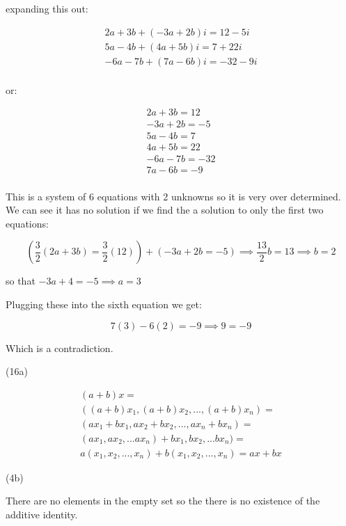 \documentclass{article}
\begin{document}
\noindent expanding this out:

\begin{gather*}
  2a + 3b + (-3a + 2b)i = 12 - 5i\\
  5a - 4b + (4a + 5b)i= 7 + 22i\\
  -6a - 7b + (7a - 6b)i = -32 - 9i\\
\end{gather*}

\noindent or:

\begin{gather*}
  2a + 3b = 12\\
  -3a + 2b = -5\\
   5a - 4b = 7\\
  4a + 5b = 22\\
  -6a - 7b = -32\\
  7a - 6b = -9\\
\end{gather*}

This is a system of 6 equations with 2 unknowns so it is very over determined. We can see it has no solution if we find the a solution to only the first two equations:

$$\left(\frac{3}{2}(2a + 3b) = \frac{3}{2}(12)\right) + (-3a + 2b = -5) \implies \frac{13}{2}b = 13 \implies b = 2 $$

so that $-3a + 4 = -5 \implies a = 3$

Plugging these into the sixth equation we get:

$$7(3) - 6(2) = -9 \implies 9 = -9$$

Which is a contradiction.

\newpage

\noindent(16a)

\begin{gather*}
  (a+b)x =\\
  ((a+b)x_1,(a+b)x_2,...,(a+b)x_n) =\\
  (ax_1 + bx_1, ax_2 + bx_2,...,ax_n + bx_n) =\\
  (ax_1, ax_2,...ax_n) + bx_1,bx_2,...bx_n) =\\
  a (x_1, x_2,...,x_n) + b(x_1, x_2,...,x_n) =
  ax+bx
\end{gather*}

\vspace{3mm}

\noindent(4b)

\vspace{3mm}

\noindent There are no elements in the empty set so the there is no existence of the additive identity.
\end{document}
